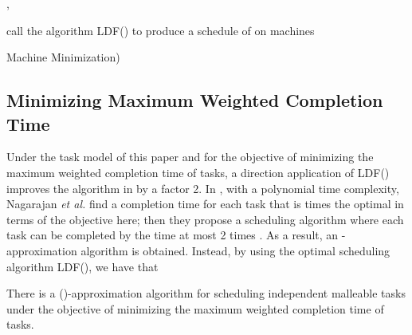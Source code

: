 \documentclass[10pt,journal,compsoc]{IEEEtran}
\begin{document}
\begin{algorithm}
\BlankLine
\BlankLine

,  

\;



call the algorithm LDF() to produce a schedule of  on  machines\;



\caption{Machine Minimization)\label{minimization}}
\end{algorithm}








\subsection{Minimizing Maximum Weighted Completion Time}


Under the task model of this paper and for the objective of minimizing the maximum weighted completion time of tasks, a direction application of LDF() improves the algorithm in \cite{Nagarajan} by a factor 2. In \cite{Nagarajan}, with a polynomial time complexity, Nagarajan {\em et al.} find a completion time  for each task  that is  times the optimal in terms of the objective here; then they propose a scheduling algorithm where each task can be completed by the time at most 2 times . As a result, an -approximation algorithm is obtained. Instead, by using the optimal scheduling algorithm LDF(), we have that
\begin{proposition}
There is a ()-approximation algorithm for scheduling independent malleable tasks under the objective of minimizing the maximum weighted completion time of tasks.
\end{proposition}
\end{document}
